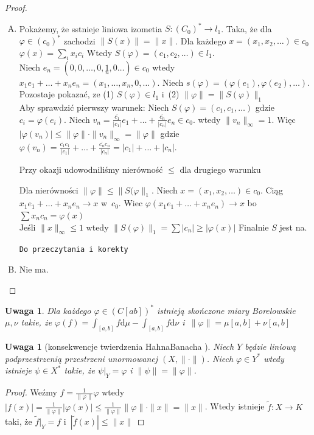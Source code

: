 \documentclass[11pt]{mwrep}
\renewcommand{\[}{\begin{equation}}
\renewcommand{\]}{\end{equation}}
\newcommand{\dd}{\mathrm{d}}
\newcommand{\norm}{\|\cdot\|}
\newtheorem{uw}[subsection]{Uwaga}
\newcounter{numer}
\begin{document}
\begin{proof}
	\begin{enumerate}[(A)]
		\item Pokażemy, że sstnieje liniowa izometia $S\colon(C_0)^* \to l_1$. Taka, że dla $\varphi \in (c_0)^*$ zachodzi $\|S(x)\| = \|x\|$.
			Dla każdego $x= (x_1,x_2,\ldots) \in c_0$ $\varphi(x) = \sum_i x_i c_i$
			Wtedy $S(\varphi) = (c_1,c_2,\ldots) \in l_1$.\\
			Niech $e_n =(0,0,\ldots,0, \underset{n}{1},0 \ldots) \in c_0$ wtedy $x_1 e_1 + \ldots+ x_n e_n = (x_1,\ldots,x_n,0, \ldots)$.
			Niech $s(\varphi) = (\varphi(e_1), \varphi(e_2), \ldots)$.
			Pozostaje pokazać, ze (1) $S(\varphi) \in l_1$ i~(2) $\|\varphi\| = \|S(\varphi)\|_1$\\
			Aby sprawdzić pierwszy warunek: Niech $S(\varphi) = (c_1, c_1, \ldots)$ gdzie $c_i = \varphi(e_i)$.
			Niech $v_n = \frac{\overline{c_1}}{|c_1|}e_1 + \ldots+ \frac{\overline{c_n}}{|c_n|}e_n \in c_0.$ wtedy $\|v_n\|_\infty =1$.
			Więc $|\varphi(v_n)| \le \|\varphi\|\cdot \|v_n\|_\infty = \|\varphi\|$ 
			gdzie $\varphi(v_n) = \frac{\overline{c_1} c_1}{|c_1|}+\ldots+\frac{\overline{c_n} c_n}{|c_n|}= |c_1| +\ldots+|c_n|$.\par
			Przy okazji udowodniliśmy nierówność $\le$ dla drugiego warunku \par
			Dla nierówności $\|\varphi\| \le \|S(\varphi\|_1$. 
			Niech $x= (x_1,x_2, \ldots) \in c_0$. Ciąg $x_1e_1 + \ldots + x_n e_n \longrightarrow x$ w~$c_0$. 
			Wiec $\varphi(x_1e_1 + \ldots + x_n e_n) \to x$ bo $\sum x_n c_n = \varphi(x)$ \\
			Jeśli $\|x\|_\infty \le 1$ wtedy $\|S(\varphi)\|_1 = \sum |c_n| \ge |\varphi(x)|$ 
			Finalnie $S$ jest na. 

			\texttt{Do przeczytania i~korekty}
		\item Nie ma.
	\end{enumerate}
\end{proof}
\begin{uw}
	Dla każdego $\varphi\in (C[ab])^*$ istnieją skończone miary Borelowskie $\mu, \nu$ takie, że 
	$\varphi(f) = \int_{[a,b]} f \dd\mu - \int_{[a,b]} f \dd \nu$ i~$\|\varphi\| = \mu[a,b]+ \nu[a,b]$
\end{uw}
\begin{uw}[konsekwencje twierdzenia Hahna\dywiz Banacha ]
	Niech $Y$ będzie liniową podprzestrzenią przestrzeni unormowanej $(X,\norm)$.
	Niech $\varphi\in Y^*$ wtedy istnieje $\psi \in X^*$ takie, że $\psi|_Y = \varphi$ i $\|\psi\| = \|\varphi\|$.
	
\end{uw}
\begin{proof}
	Weźmy $f= \frac{1}{\|\varphi\|} \varphi$ wtedy 
	$|f(x)| = \frac{1}{\|\varphi\|}|\varphi(x)| \le \frac{1}{\|\varphi\|}\|\varphi\|\cdot \|x\| = \|x\|$.
	Wtedy istnieje $\tilde{f} \colon X \to K$ taki, że $\tilde{f}|_Y = f$ i~$ |\tilde{f}(x) | \le \|x\| $
\end{proof}
\end{document}
